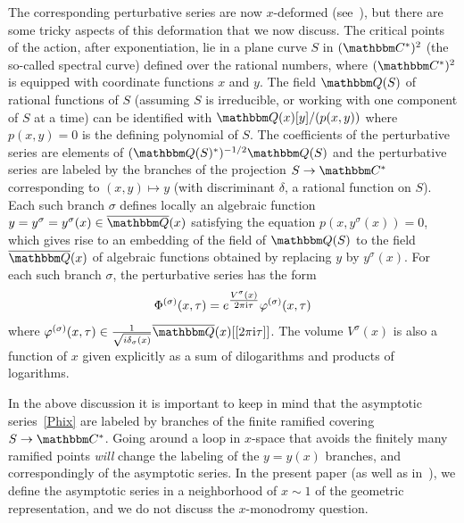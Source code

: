 \documentclass[12pt,reqno]{amsart}
\theoremstyle{definition}
\def\BQ{\mathbbm Q}
\def\BC{\mathbbm C}
\def\s{\sigma}
\def\be{\begin{equation}}
\def\ee{\end{equation}}
\def\ri{\mathrm{i}}
\def\ri{{\rm i}}
\begin{document}
The corresponding perturbative series are now $x$-deformed
(see~\cite[Sec.5.1]{GGM:peacock}), but there are some tricky aspects of this
deformation that we now discuss. The critical points of the
action, after exponentiation, lie in a plane curve $S$ in $(\BC^*)^2$ (the so-called
spectral curve) defined over the rational numbers, where $(\BC^*)^2$ is equipped with
coordinate functions $x$ and $y$. The field $\BQ(S)$ of rational functions of $S$
(assuming $S$ is irreducible, or working with one component of $S$ at a time) can be
identified with $\BQ(x)[y]/(p(x,y))$ where $p(x,y)=0$ is the defining polynomial of $S$. 
The coefficients of the perturbative series are elements of $(\BQ(S)^*)^{-1/2} \BQ(S)$
and the perturbative series are labeled by the branches of the projection $S \to \BC^*$
corresponding to $(x,y) \mapsto y$ (with discriminant $\delta$, a rational function
on $S$). Each such branch $\s$ defines locally an algebraic function
$y=y^\s=y^\s(x) \in \overline{\BQ}(x)$ satisfying the equation $p(x,y^\s(x))=0$,
which gives rise to  an embedding of the field of $\BQ(S)$ to the field
$\overline{\BQ}(x)$ of algebraic functions obtained by replacing $y$ by $y^\s(x)$. 
For each such branch $\s$, the perturbative series has the form 
\be
\label{Phix}
\Phi^{(\s)}(x,\tau) = e^{\tfrac{V^{\s}(x)}{2\pi\ri\tau}} \varphi^{(\s)}(x,\tau)
\ee
where $\varphi^{(\s)}(x,\tau) \in \frac{1}{\sqrt{i\delta_\s(x)}}
\overline{\BQ}(x)[[2\pi\ri\tau]]$. The volume $V^{\s}(x)$ is also a function of $x$
given explicitly as a sum of dilogarithms and products of logarithms.

In the above discussion it is important to keep in mind that the asymptotic
series~\eqref{Phix} are labeled by branches of the finite ramified covering
$S \to \BC^*$. Going around a loop in $x$-space that avoids the finitely many
ramified points \emph{will} change the labeling of the $y=y(x)$ branches, and
correspondingly of the asymptotic series. In the present paper (as well as
in~\cite{GGM:peacock}), we define the asymptotic series in a neighborhood
of $x \sim 1$ of the geometric representation, and we do not discuss the
$x$-monodromy question. 
\end{document}
